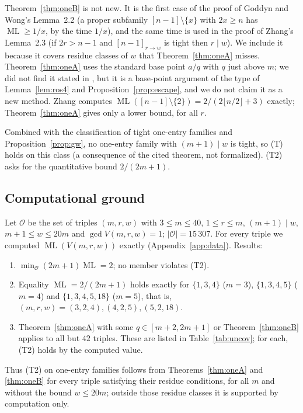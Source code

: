 \documentclass[11pt]{amsart}
\theoremstyle{plain}
\theoremstyle{definition}
\theoremstyle{remark}
\newcommand{\ML}{\operatorname{ML}}
\begin{document}
Theorem~\ref{thm:oneB} is not new. It is the first case of the proof of Goddyn and Wong's
Lemma~2.2 \cite{gw} (a proper subfamily $[n-1]\setminus\{x\}$ with $2x\ge n$ has
$\ML\ge1/x$, by the time $1/x$), and the same time is used in the proof of Zhang's
Lemma~2.3 \cite{zhang} (if $2r>n-1$ and $[n-1]_{r\to w}$ is tight then $r\mid w$). We include it
because it covers residue classes of $w$ that Theorem~\ref{thm:oneA} misses.
Theorem~\ref{thm:oneA} uses the standard base point $a/q$ with $q$ just above $m$; we did not
find it stated in \cite{gw,zhang,kravitz}, but it is a base-point argument of the type of
Lemma~\ref{lem:ros4} and Proposition~\ref{prop:escape}, and we do not claim it as a new method. Zhang
\cite[Thm.~2.9]{zhang} computes $\ML([n-1]\setminus\{2\})=2/(2\lfloor n/2\rfloor+3)$ exactly;
Theorem~\ref{thm:oneA} gives only a lower bound, for all $r$.

Combined with the classification of tight one-entry families \cite[Thm.~1.2]{zhang} and
Proposition~\ref{prop:gw}, no one-entry family with $(m+1)\mid w$ is tight, so (T) holds on this
class (a consequence of the cited theorem, not formalized). (T2) asks for the quantitative
bound $2/(2m+1)$.

\subsection*{Computational ground}
Let $\mathcal O$ be the set of triples $(m,r,w)$ with $3\le m\le 40$, $1\le r\le m$,
$(m+1)\mid w$, $m+1\le w\le 20m$ and $\gcd V(m,r,w)=1$; $|\mathcal O|=15\,307$. For every triple
we computed $\ML(V(m,r,w))$ exactly (Appendix~\ref{app:data}). Results:
\begin{enumerate}
\item $\min_{\mathcal O}(2m+1)\ML=2$; no member violates (T2).
\item Equality $\ML=2/(2m+1)$ holds exactly for $\{1,3,4\}$ ($m=3$), $\{1,3,4,5\}$ ($m=4$) and
$\{1,3,4,5,18\}$ ($m=5$), that is, $(m,r,w)=(3,2,4),(4,2,5),(5,2,18)$.
\item Theorem~\ref{thm:oneA} with some $q\in[m+2,2m+1]$ or Theorem~\ref{thm:oneB} applies to
all but $42$ triples. These are listed in Table~\ref{tab:uncov}; for each, (T2) holds by the
computed value.
\end{enumerate}
Thus (T2) on one-entry families follows from Theorems~\ref{thm:oneA} and \ref{thm:oneB} for
every triple satisfying their residue conditions, for all $m$ and without the bound $w\le 20m$;
outside those residue classes it is supported by computation only.
\end{document}
